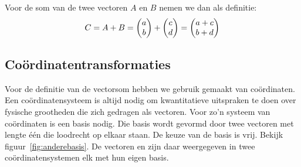 \documentclass[../main.tex]{subfiles}
\begin{document}
\begin{mdframed}[style=wiskader,frametitle=\section*{Wiskundekader~1: vectoren}]
Voor de som van de twee vectoren $A$ en $B$ nemen we dan als definitie:
$$C =  A +  B  = 
\mqty(a\\b)+\mqty(c\\d)=\mqty(a+c\\b+d)$$  

\subsection*{Co\"ordinatentransformaties}
Voor de definitie van de vectorsom hebben we gebruik gemaakt van co\"ordinaten. Een co\"ordinatensysteem is altijd nodig om kwantitatieve uitspraken te doen over fysische grootheden die zich gedragen als vectoren. Voor zo'n systeem van co\"ordinaten is een basis nodig. Die basis wordt gevormd door twee vectoren met lengte \'e\'en die loodrecht op elkaar staan. 
De keuze van de basis is vrij. Bekijk figuur~\ref{fig:anderebasis}. De vectoren  en  zijn daar weergegeven in twee co\"ordinatensystemen elk met hun eigen basis.

\iffalse%
\begin{center}
\leavevmode
\texttt{[image: ./img/anderebasis.png]}
 \captionof{figure}{Twee vectoren. De keuze van het co\"ordinatensysteem is vrij. 
Bij een transformatie van het ene co\"ordinaten-systeem naar het andere blijven lengte en richting van de vectoren behouden. \label {fig:anderebasis}}
\end{center}
\fi%
\begin{minipage}{\textwidth}%
\end{minipage}
\end{mdframed}
\end{document}
